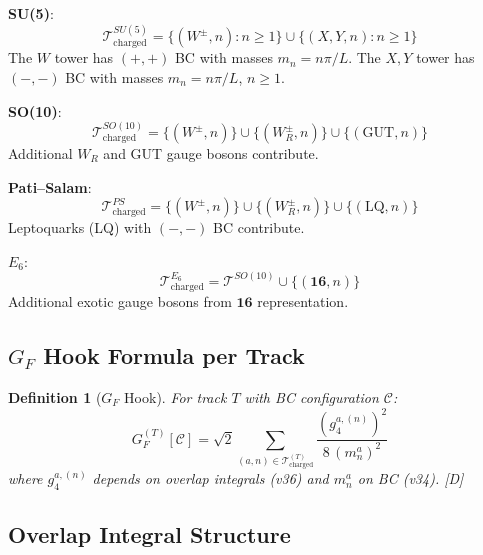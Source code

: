 \documentclass[11pt,a4paper]{article}
\newtheorem{definition}[theorem]{Definition}
\newcommand{\tagD}{\textcolor{blue!70!black}{[D]}}
\begin{document}
\begin{resultbox}
\textbf{SU(5)}:
\begin{equation}
\label{eq:su5-charged}
\mathcal{T}_{\text{charged}}^{SU(5)} = \{(W^{\pm}, n) : n \geq 1\} \cup \{(X, Y, n) : n \geq 1\}
\end{equation}
The $W$ tower has $(+,+)$ BC with masses $m_n = n\pi/L$.
The $X, Y$ tower has $(-,-)$ BC with masses $m_n = n\pi/L$, $n \geq 1$.

\textbf{SO(10)}:
\begin{equation}
\label{eq:so10-charged}
\mathcal{T}_{\text{charged}}^{SO(10)} = \{(W^{\pm}, n)\} \cup \{(W_R^{\pm}, n)\} \cup \{(\text{GUT}, n)\}
\end{equation}
Additional $W_R$ and GUT gauge bosons contribute.

\textbf{Pati--Salam}:
\begin{equation}
\label{eq:ps-charged}
\mathcal{T}_{\text{charged}}^{PS} = \{(W^{\pm}, n)\} \cup \{(W_R^{\pm}, n)\} \cup \{(\text{LQ}, n)\}
\end{equation}
Leptoquarks (LQ) with $(-,-)$ BC contribute.

\textbf{$E_6$}:
\begin{equation}
\label{eq:e6-charged}
\mathcal{T}_{\text{charged}}^{E_6} = \mathcal{T}^{SO(10)} \cup \{(\mathbf{16}, n)\}
\end{equation}
Additional exotic gauge bosons from $\mathbf{16}$ representation.
\end{resultbox}

\subsection{$G_F$ Hook Formula per Track}

\begin{definition}[$G_F$ Hook]
\label{def:gf-hook}
For track $T$ with BC configuration $\mathcal{C}$:
\begin{equation}
\label{eq:gf-hook}
\boxed{G_F^{(T)}[\mathcal{C}] = \sqrt{2} \sum_{(a,n) \in \mathcal{T}_{\text{charged}}^{(T)}}
\frac{(g_4^{a,(n)})^2}{8\, (m_n^a)^2}}
\end{equation}
where $g_4^{a,(n)}$ depends on overlap integrals (v36) and $m_n^a$ on BC (v34). \tagD
\end{definition}

\subsection{Overlap Integral Structure}
\end{document}
